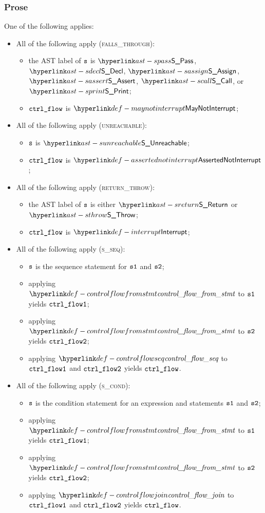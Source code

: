 \subsubsection{Prose}
One of the following applies:
\begin{itemize}
  \item All of the following apply (\textsc{falls\_through}):
  \begin{itemize}
    \item the AST label of $\texttt{s}$ is $\SPass$, $\SDecl$, $\SAssign$, $\SAssert$, $\SCall$, or $\SPrint$;
    \item $\texttt{ctrl\_flow}$ is $\maynotinterrupt$;
  \end{itemize}

  \item All of the following apply (\textsc{unreachable}):
  \begin{itemize}
    \item $\texttt{s}$ is $\SUnreachable$;
    \item $\texttt{ctrl\_flow}$ is $\assertednotinterrupt$;
  \end{itemize}

  \item All of the following apply (\textsc{return\_throw}):
  \begin{itemize}
    \item the AST label of $\texttt{s}$ is either $\SReturn$ or $\SThrow$;
    \item $\texttt{ctrl\_flow}$ is $\interrupt$;
  \end{itemize}

  \item All of the following apply (\textsc{s\_seq}):
  \begin{itemize}
    \item $\texttt{s}$ is the sequence statement for $\texttt{s1}$ and $\texttt{s2}$;
    \item applying $\controlflowfromstmt$ to $\texttt{s1}$ yields $\texttt{ctrl\_flow1}$;
    \item applying $\controlflowfromstmt$ to $\texttt{s2}$ yields $\texttt{ctrl\_flow2}$;
    \item applying $\controlflowseq$ to $\texttt{ctrl\_flow1}$ and $\texttt{ctrl\_flow2}$ yields $\texttt{ctrl\_flow}$.
  \end{itemize}

  \item All of the following apply (\textsc{s\_cond}):
  \begin{itemize}
    \item $\texttt{s}$ is the condition statement for an expression and statements $\texttt{s1}$ and $\texttt{s2}$;
    \item applying $\controlflowfromstmt$ to $\texttt{s1}$ yields $\texttt{ctrl\_flow1}$;
    \item applying $\controlflowfromstmt$ to $\texttt{s2}$ yields $\texttt{ctrl\_flow2}$;
    \item applying $\controlflowjoin$ to $\texttt{ctrl\_flow1}$ and $\texttt{ctrl\_flow2}$ yields $\texttt{ctrl\_flow}$.
  \end{itemize}


\end{itemize}

